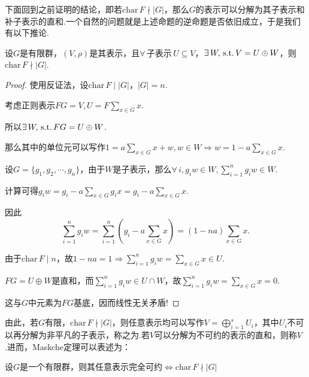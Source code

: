 下面回到之前证明的结论，即若$\mathrm{char}\, F\nmid|G|$，那么$G$的表示可以分解为其子表示和补子表示的直和.一个自然的问题就是上述命题的逆命题是否依旧成立，于是我们有以下推论.

\begin{corollary}[]
    设$G$是有限群，$(V,\rho)$是其表示，且$\forall\, \text{子表示}\,U\subseteq V$，$\exists\, W,\operatorname{\,\text{s.t.}} V=U\oplus W$，则$\mathrm{char}\, F\nmid |G|$.
\end{corollary}
\begin{proof}
    使用反证法，设$\mathrm{char}\, F \mid |G|$，$|G|=n$.\par
    考虑正则表示$FG=V,U=F\sum_{x\in G}{x}$.\par
    所以$\exists\, W,\operatorname{\,\text{s.t.}} FG=U\oplus W$.\par
    那么其中的单位元可以写作$1=a\sum_{x\in G}x+w,w\in W\Rightarrow w=1-a\sum_{x\in G}x$.\par
    设$G=\{g_1,g_2,\cdots,g_n\}$，由于$W$是子表示，那么$\forall\,i,g_iw\in W,\sum_{i=1}^n g_iw\in W$.\par
    计算可得$g_iw=g_i-a\sum_{x\in G}{g_i x}=g_i-a\sum_{x\in G}x$.\par
    因此\begin{equation*}
        \sum_{i=1}^n g_iw=\sum_{i=1}^n\left(g_i-a\sum_{x\in G}x\right)=(1-na)\sum_{x\in G}x.
    \end{equation*}

    由于$\mathrm{char}\, F\mid n$，故$1-na=1\Rightarrow \sum_{i=1}^n{g_iw}=\sum_{x\in G}x\in U$.\par
    $FG=U\oplus W$是直和，而$\sum_{i=1}^n g_iw\in U\cap W$，故$\sum_{i=1}^n g_iw=\sum_{x\in G}x=0$.\par
    这与$G$中元素为$FG$基底，因而线性无关矛盾!
\end{proof}

由此，若$G$有限，$\mathrm{char}\, F\nmid|G|$，则任意表示均可以写作$V=\bigoplus_{i=1}^s U_i$，其中$U_i$不可以再分解为非平凡的子表示，称之为.若$V$可以分解为不可约的表示的直和，则称$V$ .进而，Maskche定理可以表述为：

\begin{theorem}
    设$G$是一个有限群，则其任意表示完全可约$\iff \mathrm{char}\, F\nmid |G|$
\end{theorem}


